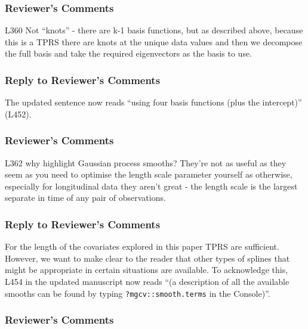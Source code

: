 \documentclass[
]{article}
\newcommand{\passthrough}[1]{#1}
\begin{document}
\hypertarget{reviewers-comments-28}{%
\subsubsection{Reviewer's Comments}\label{reviewers-comments-28}}

L360 Not ``knots'' - there are k-1 basis functions, but as described above, because this is a TPRS there are knots at the unique data values and then we decompose the full basis and take the required eigenvectors as the basis to use.

\hypertarget{section-29}{%
\subsubsection{\texorpdfstring{\textcolor{reviewersblue} {Reply to Reviewer's Comments}}{}}\label{section-29}}

The updated sentence now reads ``using four basis functions (plus the intercept)'' (L452).

\hypertarget{reviewers-comments-29}{%
\subsubsection{Reviewer's Comments}\label{reviewers-comments-29}}

L362 why highlight Gaussian process smooths? They're not as useful as they seem as you need to optimise the length scale parameter yourself as otherwise, especially for longitudinal data they aren't great - the length scale is the largest separate in time of any pair of observations.

\hypertarget{section-30}{%
\subsubsection{\texorpdfstring{\textcolor{reviewersblue} {Reply to Reviewer's Comments}}{}}\label{section-30}}

For the length of the covariates explored in this paper TPRS are sufficient. However, we want to make clear to the reader that other types of splines that might be appropriate in certain situations are available. To acknowledge this, L454 in the updated manuscript now reads ``(a description of all the available smooths can be found by typing \passthrough{\lstinline!?mgcv::smooth.terms!} in the Console)''.

\hypertarget{reviewers-comments-30}{%
\subsubsection{Reviewer's Comments}\label{reviewers-comments-30}}
\end{document}

